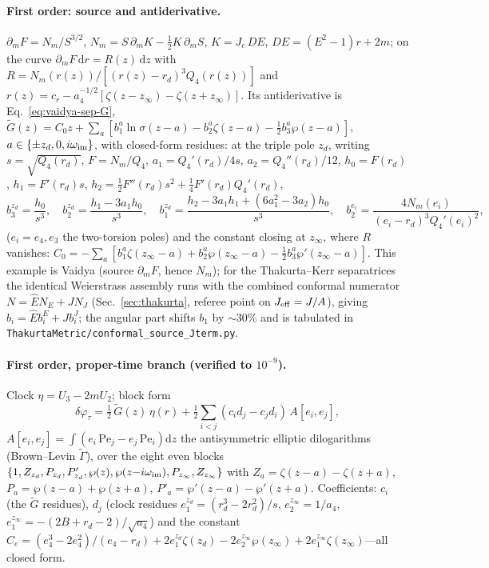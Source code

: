 \documentclass[12pt]{iopart}
\newcommand{\Ehat}{\hat E}
\newcommand{\Jc}{J_{c}}
\newcommand{\dd}{\mathrm{d}}
\begin{document}
\paragraph{First order: source and antiderivative.}
$\partial_m F=N_m/S^{3/2}$, $N_m=S\,\partial_mK-\tfrac12K\,\partial_mS$, $K=\Jc\,DE$,
$DE=(E^2-1)r+2m$; on the curve $\partial_m F\,\dd r=R(z)\,\dd z$ with
$R=N_m(r(z))/[(r(z)-r_d)^3Q_4(r(z))]$ and $r(z)=c_r-a_4^{-1/2}[\zeta(z-z_\infty)-
\zeta(z+z_\infty)]$. Its antiderivative is Eq.~\eqref{eq:vaidya-sep-G},
$\tilde G(z)=C_0 z+\sum_{a}[b_1^a\ln\sigma(z-a)-b_2^a\zeta(z-a)-\tfrac12 b_3^a
\wp(z-a)]$, $a\in\{\pm z_d,0,i\omega_{\rm im}\}$, with closed-form residues: at the
triple pole $z_d$, writing $s=\sqrt{Q_4(r_d)}$, $F=N_m/Q_4$, $a_1=Q_4'(r_d)/4s$,
$a_2=Q_4''(r_d)/12$, $h_0=F(r_d)$, $h_1=F'(r_d)s$,
$h_2=\tfrac12F''(r_d)s^2+\tfrac14F'(r_d)Q_4'(r_d)$,
\begin{equation}
b_3^{z_d}=\frac{h_0}{s^3},\quad b_2^{z_d}=\frac{h_1-3a_1h_0}{s^3},\quad
b_1^{z_d}=\frac{h_2-3a_1h_1+(6a_1^2-3a_2)h_0}{s^3},\quad
b_2^{e_i}=\frac{4N_m(e_i)}{(e_i-r_d)^3Q_4'(e_i)^2},
\end{equation}
($e_i=e_4,e_3$ the two-torsion poles) and the constant closing at $z_\infty$, where
$R$ vanishes: $C_0=-\sum_a[b_1^a\zeta(z_\infty-a)+b_2^a\wp(z_\infty-a)-\tfrac12
b_3^a\wp'(z_\infty-a)]$. This example is Vaidya (source $\partial_m F$, hence
$N_m$); for the Thakurta--Kerr separatrices the identical Weierstrass assembly runs
with the combined conformal numerator $N=\Ehat N_E+J N_J$ (Sec.~\ref{sec:thakurta},
referee point on $J_{\rm eff}=J/A$), giving $b_i=\Ehat b_i^{E}+J b_i^{J}$; the
angular part shifts $b_1$ by $\sim\!30\%$ and is tabulated in
\texttt{ThakurtaMetric/conformal\_source\_Jterm.py}.

\paragraph{First order, proper-time branch (verified to $10^{-9}$).}
Clock $\eta=U_3-2mU_2$; block form
\begin{equation}
\delta\varphi_\tau=\tfrac12\,\tilde G(z)\,\eta(r)
+\tfrac12\sum_{i<j}(c_i d_j-c_j d_i)\,A[e_i,e_j],
\end{equation}
$A[e_i,e_j]=\int(e_i\,\mathrm{Pe}_j-e_j\,\mathrm{Pe}_i)\dd z$ the antisymmetric
elliptic dilogarithms (Brown--Levin $\tilde\Gamma$), over the eight even blocks
$\{1,Z_{z_d},P_{z_d},P'_{z_d},\wp(z),\wp(z{-}i\omega_{\rm im}),P_{z_\infty},
Z_{z_\infty}\}$ with $Z_a=\zeta(z{-}a)-\zeta(z{+}a)$,
$P_a=\wp(z{-}a)+\wp(z{+}a)$, $P'_a=\wp'(z{-}a)-\wp'(z{+}a)$. Coefficients: $c_i$ (the
$\tilde G$ residues), $d_j$ (clock residues $e_1^{z_d}=(r_d^3-2r_d^2)/s$,
$e_2^{z_\infty}=1/a_4$, $e_1^{z_\infty}=-(2B+r_d-2)/\sqrt{a_4}$) and the constant
$C_e=(e_4^3-2e_4^2)/(e_4-r_d)+2e_1^{z_d}\zeta(z_d)-2e_2^{z_\infty}\wp(z_\infty)
+2e_1^{z_\infty}\zeta(z_\infty)$---all closed form.
\end{document}
